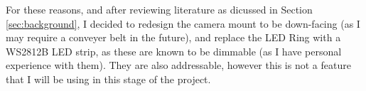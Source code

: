 For these reasons, and after reviewing literature as dicussed in Section \ref*{sec:background}, I decided to redesign the camera mount to be down-facing (as I may require a conveyer belt in the future),
and replace the LED Ring with a WS2812B LED strip, as these are known to be dimmable (as I have personal experience with them). They are also addressable, however this is not a feature that I will be using in this stage of the project.
